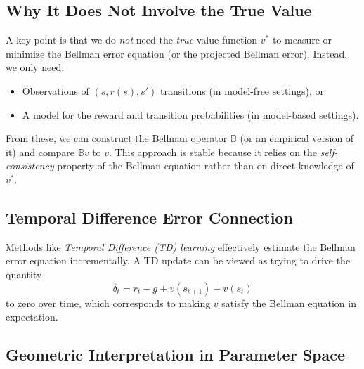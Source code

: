\subsection{Why It Does Not Involve the True Value}
A key point is that we do \emph{not} need the \emph{true} value function $v^*$ to measure or minimize the Bellman error equation (or the projected Bellman error). Instead, we only need:
\begin{itemize}
    \item Observations of $(s, r(s), s')$ transitions (in model-free settings), or
    \item A model for the reward and transition probabilities (in model-based settings).
\end{itemize}
From these, we can construct the Bellman operator $\mathbb{B}$ (or an empirical version of it) and compare $\mathbb{B}v$ to $v$. This approach is stable because it relies on the \emph{self-consistency} property of the Bellman equation rather than on direct knowledge of $v^*$.

\subsection{Temporal Difference Error Connection}
Methods like \emph{Temporal Difference (TD) learning} effectively estimate the Bellman error equation incrementally. A TD update can be viewed as trying to drive the quantity
\[
\delta_t 
= r_t - g + v(s_{t+1}) - v(s_t)
\]
to zero over time, which corresponds to making $v$ satisfy the Bellman equation in expectation.

\subsection{Geometric Interpretation in Parameter Space}

